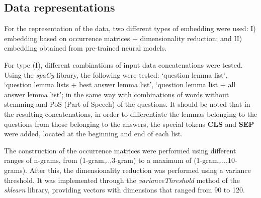 \subsection{Data representations}
For the representation of the data, two different types of embedding were used: I) embedding based on occurrence matrices + dimensionality reduction; and II) embedding obtained from pre-trained neural models.

For type (I), different combinations of input data concatenations were tested. Using the \emph{spaCy} library, the following were tested: `question lemma list', `question lemma lists + best answer lemma list', `question lemma list + all answer lemma list'; in the same way with combinations of words without stemming and PoS (Part of Speech) of the questions. It should be noted that in the resulting concatenations, in order to differentiate the lemmas belonging to the questions from those belonging to the answers, the special tokens \textbf{CLS} and \textbf{SEP} were added, located at the beginning and end of each list.

The construction of the occurrence matrices were performed using different ranges of n-grams, from (1-gram,..,3-gram) to a maximum of (1-gram,...,10-grams). After this, the dimensionality reduction was performed using a variance threshold. It was implemented through the \emph{varianceThreshold} method of the \emph{sklearn} library, providing vectors with dimensions that ranged from 90 to 120.

